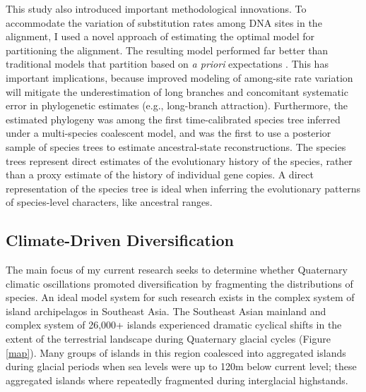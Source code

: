 \documentclass[10pt]{article}
\begin{document}
This study also introduced important methodological innovations.
To accommodate the variation of substitution rates among DNA sites in the
alignment, I used a novel approach of estimating the optimal model for
partitioning the alignment.
The resulting model performed far better than traditional models that
partition based on \emph{a priori} expectations .
This has important implications, because improved modeling of among-site rate
variation will mitigate the underestimation of long branches and concomitant
systematic error in phylogenetic estimates (e.g., long-branch attraction).
Furthermore, the estimated phylogeny was among the first time-calibrated
species tree inferred under a multi-species coalescent model, and was the first
to use a posterior sample of species trees to estimate ancestral-state
reconstructions.
The species trees represent direct estimates of the evolutionary history of the
species, rather than a proxy estimate of the history of individual gene copies.
A direct representation of the species tree is ideal when inferring the
evolutionary patterns of species-level characters, like ancestral ranges.

\subsection*{Climate-Driven Diversification}
The main focus of my current research seeks to determine whether Quaternary
climatic oscillations promoted diversification by fragmenting the distributions
of species.
An ideal model system for such research exists in the complex system of island
archipelagos in Southeast Asia.
The Southeast Asian mainland and complex system of 26,000+ islands experienced
dramatic cyclical shifts in the extent of the terrestrial landscape during
Quaternary glacial cycles (Figure \ref{map}).
Many groups of islands in this region coalesced into aggregated islands during
glacial periods when sea levels were up to 120m below current level; these
aggregated islands where repeatedly fragmented during interglacial highstands.
\end{document}
